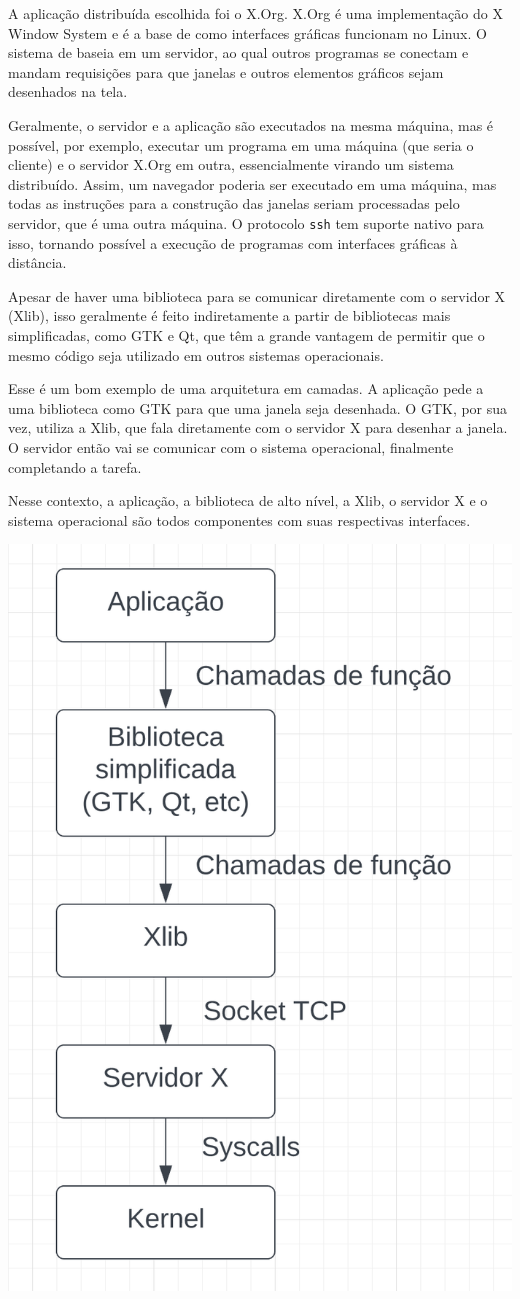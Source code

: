 \documentclass[12pt]{article}
\begin{document}
A aplicação distribuída escolhida foi o X.Org.
X.Org é uma implementação do X Window System e
é a base de como interfaces gráficas funcionam no Linux.
O sistema de baseia em um servidor,
ao qual outros programas se conectam
e mandam requisições para que
janelas e outros elementos gráficos sejam desenhados na tela.

Geralmente, o servidor e a aplicação são executados na mesma máquina,
mas é possível, por exemplo,
executar um programa em uma máquina (que seria o cliente) e
o servidor X.Org em outra,
essencialmente virando um sistema distribuído.
Assim, um navegador poderia ser executado em uma máquina,
mas todas as instruções para a construção das janelas
seriam processadas pelo servidor,
que é uma outra máquina.
O protocolo \texttt{ssh} tem suporte nativo para isso,
tornando possível a execução de programas
com interfaces gráficas à distância.

Apesar de haver uma biblioteca para
se comunicar diretamente com o servidor X (Xlib),
isso geralmente é feito indiretamente
a partir de bibliotecas mais simplificadas,
como GTK e Qt,
que têm a grande vantagem de
permitir que o mesmo código seja utilizado em outros sistemas operacionais.

Esse é um bom exemplo de uma arquitetura em camadas.
A aplicação pede a uma biblioteca como GTK
para que uma janela seja desenhada.
O GTK, por sua vez, utiliza a Xlib,
que fala diretamente com o servidor X
para desenhar a janela.
O servidor então vai se comunicar
com o sistema operacional,
finalmente completando a tarefa.

Nesse contexto,
a aplicação, a biblioteca de alto nível, a Xlib, o servidor X e o sistema operacional
são todos componentes com suas respectivas interfaces.

\includegraphics[height=\textwidth]{x}
\end{document}
